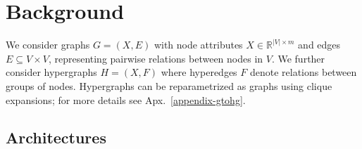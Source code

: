 \section{Background}
\label{background}
We consider graphs $G=(X,E)$ with node attributes $X \in \mathbb{R}^{\vert V \vert \times m}$ and edges $E \subseteq V \times V$, representing pairwise relations between nodes in $V$. We further consider hypergraphs $H=(X,F)$ where hyperedges $F$ denote relations between groups of nodes. Hypergraphs can be reparametrized as graphs using clique expansions; for more details see Apx.~\ref{appendix-gtohg}.

\subsection{Architectures}


